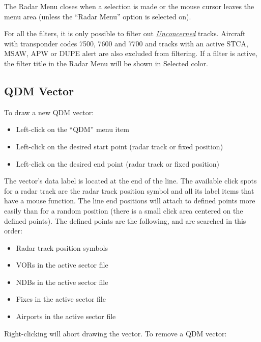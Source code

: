 \documentclass[a4paper,oneside,11pt]{memoir}
\newcommand{\colorref}[1]{\colorbox{Flight Highlight}{\color{#1}#1}}
\newcommand{\stateref}[1]{\textit{\hyperref[state:#1]{#1}}}
\begin{document}
\bigskip

The Radar Menu closes when a selection is made or the mouse cursor leaves the menu area (unless the “Radar Menu” option is selected on).

\bigskip

For all the filters, it is only possible to filter out \stateref{Unconcerned} tracks. Aircraft with transponder codes 7500, 7600 and 7700 and tracks with an active STCA, MSAW, APW or DUPE alert are also excluded from filtering. If a filter is active, the filter title in the Radar Menu will be shown in \colorref{Selected} color.

\subsection{QDM Vector}
\label{tool:qdm}

To draw a new QDM vector:
\begin{itemize}
    \item Left-click on the “QDM” menu item
    \item Left-click on the desired start point (radar track or fixed position)
    \item Left-click on the desired end point (radar track or fixed position)
\end{itemize}

\bigskip

The vector’s data label is located at the end of the line. The available click spots for a radar track are the radar track position symbol and all its label items that have a mouse function.
The line end positions will attach to defined points more easily than for a random position (there is a small click area centered on the defined points). The defined points are the following, and are searched in this order:

\begin{itemize}
    \item Radar track position symbols
    \item VORs in the active sector file
    \item NDBs in the active sector file
    \item Fixes in the active sector file
    \item Airports in the active sector file
\end{itemize}

\bigskip

Right-clicking will abort drawing the vector.
To remove a QDM vector:
\end{document}
